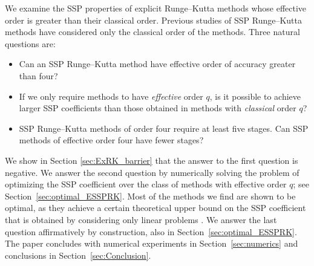 We examine the SSP properties of explicit Runge--Kutta methods whose
effective order is greater than their classical order.
Previous studies of SSP Runge--Kutta methods have considered only the
classical order of the methods.
Three natural questions are:
\begin{itemize}
    \item Can an SSP Runge--Kutta method have effective order of accuracy greater than four?
    \item If we only require methods to have {\em effective} order $q$, is it possible to achieve larger
            SSP coefficients than those obtained in methods with {\em classical} order $q$?
    \item SSP Runge--Kutta methods of order four require at least five stages.  Can SSP methods of 
          effective order four have fewer stages?
          
\end{itemize}
We show in Section \ref{sec:ExRK_barrier} that the answer to the first question is negative.
We answer the second question by numerically solving the problem of optimizing
the SSP coefficient over the class of methods with effective order $q$;
see Section~\ref{sec:optimal_ESSPRK}.  
Most of the methods we find are shown to be optimal, as they achieve a certain theoretical
upper bound on the SSP coefficient that is obtained by considering only
linear problems \cite{Kraaijevanger1986}.
We answer the last question affirmatively
by construction, also in Section~\ref{sec:optimal_ESSPRK}.
The paper concludes with numerical experiments in
Section~\ref{sec:numerics} and conclusions in
Section~\ref{sec:Conclusion}.
